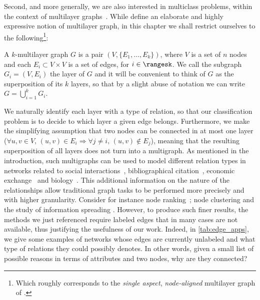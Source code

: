 Second, and more generally, we are also interested in multiclass problems, within the context of
multilayer graphs~\autocites{Kivela2014}{multiSurvey14}. While \textcite{Kivela2014} define an
elaborate and highly expressive notion of multilayer graph, in this chapter we shall restrict
ourselves to the following\footnote{Which roughly corresponds to the \emph{single aspect},
\emph{node-aligned} multilayer graph of \autocite{Kivela2014}.}:
\begin{definition}
  A $k$-multilayer graph $G$ is a pair $(V, \{E_1, \ldots, E_k \})$, where $V$ is a set of $n$ nodes
  and each $E_i \subset V\times V$ is a set of edges, for $i \in \rangesk$. We call the subgraph $G_i =
  (V, E_i)$ the \ith{} layer of $G$ and it will be convenient to think of $G$ as the superposition
  of its $k$ layers, so that by a slight abuse of notation we can write $ G = \bigcup_{i=1}^k G_i $.
\end{definition}%
We naturally identify each layer with a type of relation, so that our classification problem is to
decide to which layer a given edge belongs. Furthermore, we make the simplifying assumption that two
nodes can be connected in at most one layer (\ie $\forall u,v \in V,\, (u,v)\in E_i \Rightarrow
\forall j \neq i,\, (u,v) \notin E_j$), meaning that the resulting superposition of all layers does
not turn into a multigraph. As mentioned in the introduction, such multigraphs can be used to model
different relation types in networks related to social
interactions~\autocites{Szell2010}{RecoFlickrMulti11}, bibliographical
citation~\autocites{communityDBLPbyConf05}{articlesMultiSim11}, economic
exchange~\autocites{ports3kindofships10}{worldTradeNetwork10} and biology~\autocite{bioLayerExp11}.
This additional information on the nature of the relationships allow traditional graph tasks to be
performed more precisely and with higher granularity. Consider for instance node ranking~\autocite{HRRanking13};
node clustering \autocites[Section 2]{surveyAttributedClustering15}[Section 4.5.1]{Kivela2014} and
the study of information spreading \autocite{SpreadingMultiSurvey15}. However, to produce such finer
results, the methods we just referenced require labeled edges that in many cases are not available,
thus justifying the usefulness of our work. Indeed, in \autoref{tab:edge_apps}, we give some examples of
networks whose edges are currently unlabeled and what type of relations they could possibly denotes.
In other words, given a small list of possible reasons in terms of attributes and two nodes, why are
they connected?

